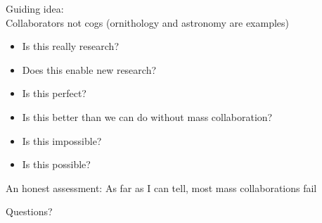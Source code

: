 \documentclass[aspectratio=169]{beamer}
\begin{document}
\begin{frame}

Guiding idea:\\
Collaborators not cogs (ornithology and astronomy are examples)

\end{frame}
\begin{frame}

\begin{itemize}
\item Is this really research?
\pause
\item Does this enable new research?
\end{itemize}

\end{frame}
\begin{frame}

\begin{itemize}
\item Is this perfect?
\pause
\item Is this better than we can do without mass collaboration?
\end{itemize}

\end{frame}
\begin{frame}

\begin{itemize}
\item Is this impossible?
\pause
\item Is this possible?
\end{itemize}

\end{frame}
\begin{frame}

An honest assessment: \pause As far as I can tell, most mass collaborations fail

\end{frame}
\begin{frame}

{\Large
\begin{center}
Questions? 
\end{center}
}

\end{frame}
\end{document}
